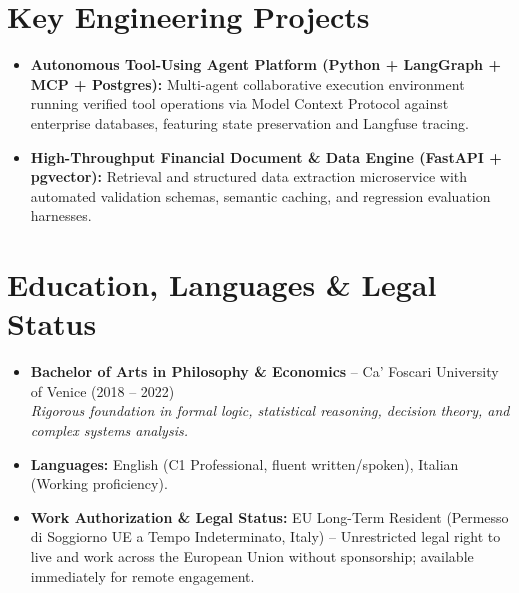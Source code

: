 \documentclass[a4paper,10pt]{article}
\begin{document}
\section{Key Engineering Projects}
\begin{itemize}
  \item \textbf{Autonomous Tool-Using Agent Platform (Python + LangGraph + MCP + Postgres):} Multi-agent collaborative execution environment running verified tool operations via Model Context Protocol against enterprise databases, featuring state preservation and Langfuse tracing.
  \item \textbf{High-Throughput Financial Document \& Data Engine (FastAPI + pgvector):} Retrieval and structured data extraction microservice with automated validation schemas, semantic caching, and regression evaluation harnesses.
\end{itemize}

\section{Education, Languages \& Legal Status}
\begin{itemize}
  \item \textbf{Bachelor of Arts in Philosophy \& Economics} -- Ca' Foscari University of Venice (2018 -- 2022) \\
  \textit{Rigorous foundation in formal logic, statistical reasoning, decision theory, and complex systems analysis.}
  \item \textbf{Languages:} English (C1 Professional, fluent written/spoken), Italian (Working proficiency).
  \item \textbf{Work Authorization \& Legal Status:} EU Long-Term Resident (Permesso di Soggiorno UE a Tempo Indeterminato, Italy) -- Unrestricted legal right to live and work across the European Union without sponsorship; available immediately for remote engagement.
\end{itemize}
\end{document}
